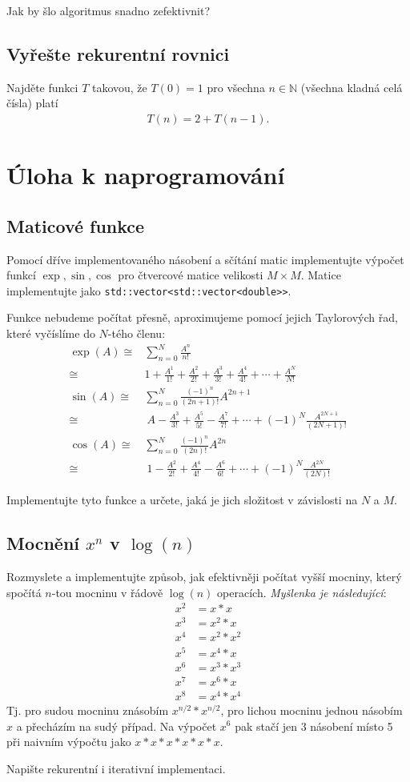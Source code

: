 \documentclass[12pt,oneside]{article}
\begin{document}
	Jak by šlo algoritmus snadno zefektivnit?
	
	\subsection{Vyřešte rekurentní rovnici}
	Najděte funkci $T$ takovou, že $T(0) = 1$ pro všechna $n \in \mathbb{N}$ (všechna kladná celá čísla) platí
	\begin{align}
		T(n) = 2 + T(n-1).
	\end{align}

	\section{Úloha k naprogramování}
	\subsection{Maticové funkce}
	Pomocí dříve implementovaného násobení a sčítání matic implementujte výpočet funkcí $\exp, \sin, \cos$ pro čtvercové matice velikosti $M \times M$.
	Matice implementujte jako \verb*|std::vector<std::vector<double>>|.
	
	
	Funkce nebudeme počítat přesně, aproximujeme pomocí jejich Taylorových řad, které vyčíslíme do $N$-tého členu:
	\begin{align}
		\exp(A) \cong& \sum_{n=0}^{N} \frac{A^n}{n!} \\
				\cong& 1 + \frac{A^1}{1!} + \frac{A^2}{2!} + \frac{A^3}{3!} + \frac{A^4}{4!} + \cdots + \frac{A^N}{N!} \\
		\sin(A) \cong& \sum_{n=0}^N \frac{(-1)^n}{(2n+1)!}A^{2n+1} \\
				\cong&\ A - \frac{A^3}{3!} + \frac{A^5}{5!} - \frac{A^7}{7!} + \cdots + (-1)^N\frac{A^{2N+1}}{(2N+1)!} \\
		\cos(A) \cong& \sum_{n=0}^N \frac{(-1)^n}{(2n)!}A^{2n} \\
				\cong&\ 1 - \frac{A^2}{2!} + \frac{A^4}{4!} - \frac{A^6}{6!} + \cdots + (-1)^N\frac{A^{2N}}{(2N)!}
	\end{align}

	Implementujte tyto funkce a určete, jaká je jich složitost v závislosti na $N$ a $M$.
	
	\subsection{Mocnění $x^n$ v $\log(n)$}
	Rozmyslete a implementujte způsob, jak efektivněji počítat vyšší mocniny, který spočítá $n$-tou mocninu v řádově $\log(n)$ operacích. \textit{Myšlenka je následující}:
	\begin{align}
		x^2 &= x*x \\
		x^3 &= x^2*x \\
		x^4 &= x^2*x^2 \\
		x^5 &= x^4*x \\
		x^6 &= x^3*x^3 \\
		x^7 &= x^6 * x \\
		x^8 &= x^4 * x^4 
	\end{align}
	Tj. pro sudou mocninu znásobím $x^{n/2}*x^{n/2}$, pro lichou mocninu jednou násobím $x$ a přecházím na sudý případ.
	Na výpočet $x^6$ pak stačí jen 3 násobení místo 5 při naivním výpočtu jako $x*x*x*x*x*x$.
	
	Napište rekurentní i iterativní implementaci.
\end{document}

